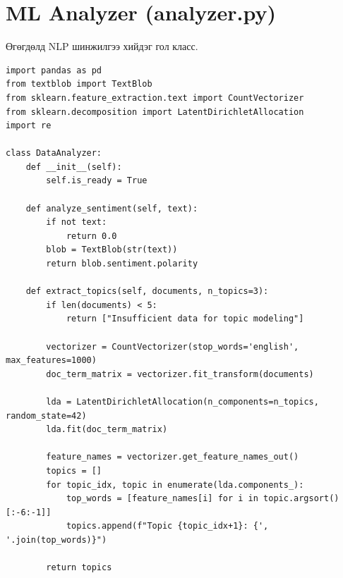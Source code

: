 \section{ML Analyzer (analyzer.py)}
Өгөгдөлд NLP шинжилгээ хийдэг гол класс.
\begin{verbatim}
import pandas as pd
from textblob import TextBlob
from sklearn.feature_extraction.text import CountVectorizer
from sklearn.decomposition import LatentDirichletAllocation
import re

class DataAnalyzer:
    def __init__(self):
        self.is_ready = True
        
    def analyze_sentiment(self, text):
        if not text:
            return 0.0
        blob = TextBlob(str(text))
        return blob.sentiment.polarity

    def extract_topics(self, documents, n_topics=3):
        if len(documents) < 5:
            return ["Insufficient data for topic modeling"]
            
        vectorizer = CountVectorizer(stop_words='english', max_features=1000)
        doc_term_matrix = vectorizer.fit_transform(documents)
        
        lda = LatentDirichletAllocation(n_components=n_topics, random_state=42)
        lda.fit(doc_term_matrix)
        
        feature_names = vectorizer.get_feature_names_out()
        topics = []
        for topic_idx, topic in enumerate(lda.components_):
            top_words = [feature_names[i] for i in topic.argsort()[:-6:-1]]
            topics.append(f"Topic {topic_idx+1}: {', '.join(top_words)}")
            
        return topics
\end{verbatim}
